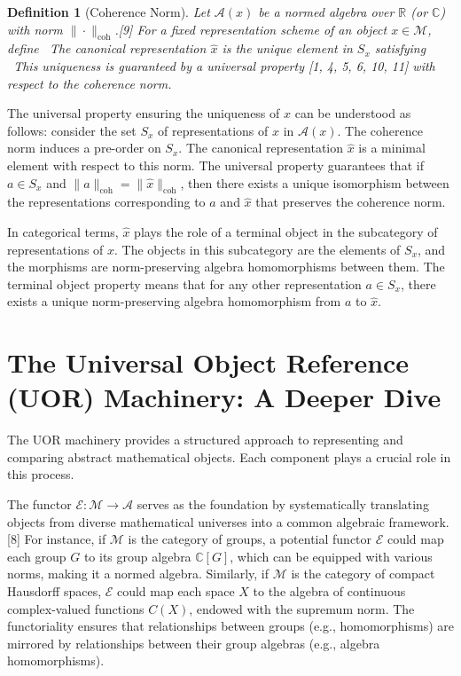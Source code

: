 \documentclass{article}
\newtheorem{definition}[theorem]{Definition}
\begin{document}
\begin{definition}[Coherence Norm]
Let $\mathcal{A}(x)$ be a normed algebra over $\mathbb{R}$ (or $\mathbb{C}$) with norm $\|\cdot\|_{\mathrm{coh}}$.[9] For a fixed representation scheme of an object $x \in \mathcal{M}$, define
\
The \emph{canonical representation} $\hat{x}$ is the unique element in $S_x$ satisfying
\
This uniqueness is guaranteed by a universal property [1, 4, 5, 6, 10, 11] with respect to the coherence norm.
\end{definition}

The universal property ensuring the uniqueness of $\hat{x}$ can be understood as follows: consider the set $S_x$ of representations of $x$ in $\mathcal{A}(x)$. The coherence norm induces a pre-order on $S_x$. The canonical representation $\hat{x}$ is a minimal element with respect to this norm. The universal property guarantees that if $a \in S_x$ and $\|a\|_{\mathrm{coh}} = \|\hat{x}\|_{\mathrm{coh}}$, then there exists a unique isomorphism between the representations corresponding to $a$ and $\hat{x}$ that preserves the coherence norm.

In categorical terms, $\hat{x}$ plays the role of a terminal object in the subcategory of representations of $x$. The objects in this subcategory are the elements of $S_x$, and the morphisms are norm-preserving algebra homomorphisms between them. The terminal object property means that for any other representation $a \in S_x$, there exists a unique norm-preserving algebra homomorphism from $a$ to $\hat{x}$.

\section{The Universal Object Reference (UOR) Machinery: A Deeper Dive}

The UOR machinery provides a structured approach to representing and comparing abstract mathematical objects. Each component plays a crucial role in this process.

The functor $\mathcal{E} : \mathcal{M} \to \mathcal{A}$ serves as the foundation by systematically translating objects from diverse mathematical universes into a common algebraic framework.[8] For instance, if $\mathcal{M}$ is the category of groups, a potential functor $\mathcal{E}$ could map each group $G$ to its group algebra $\mathbb{C}[G]$, which can be equipped with various norms, making it a normed algebra. Similarly, if $\mathcal{M}$ is the category of compact Hausdorff spaces, $\mathcal{E}$ could map each space $X$ to the algebra of continuous complex-valued functions $C(X)$, endowed with the supremum norm. The functoriality ensures that relationships between groups (e.g., homomorphisms) are mirrored by relationships between their group algebras (e.g., algebra homomorphisms).
\end{document}
